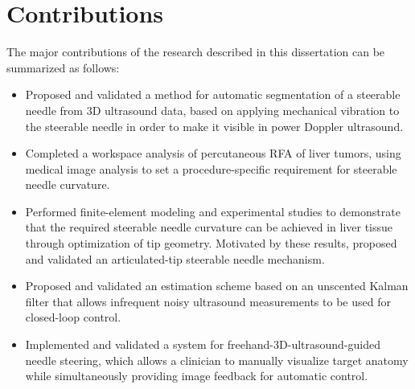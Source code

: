 \section{Contributions}
The major contributions of the research described in this dissertation can be summarized as follows:
\begin{itemize}
\item Proposed and validated a method for automatic segmentation of a steerable needle from 3D ultrasound data, based on applying mechanical vibration to the steerable needle in order to make it visible in power Doppler ultrasound.
\item Completed a workspace analysis of percutaneous RFA of liver tumors, using medical image analysis to set a procedure-specific requirement for steerable needle curvature.  
\item Performed finite-element modeling and experimental studies to demonstrate that the required steerable needle curvature can be achieved in liver tissue through optimization of tip geometry. Motivated by these results, proposed and validated an articulated-tip steerable needle mechanism.   
\item Proposed and validated an estimation scheme based on an unscented Kalman filter that allows infrequent noisy ultrasound measurements to be used for closed-loop control.
\item Implemented and validated a system for freehand-3D-ultrasound-guided needle steering, which allows a clinician to manually visualize target anatomy while simultaneously providing image feedback for automatic control.  
\end{itemize}

